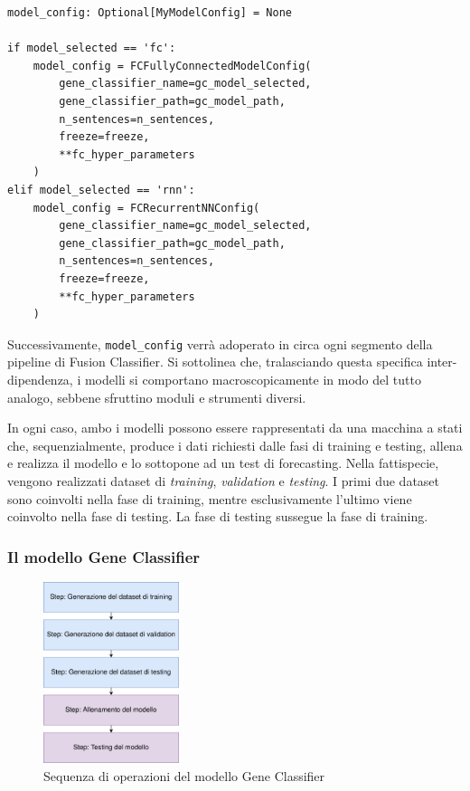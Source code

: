 \begin{code}
\label{code:apx:a:python}
\begin{verbatim}
model_config: Optional[MyModelConfig] = None

if model_selected == 'fc':
    model_config = FCFullyConnectedModelConfig(
        gene_classifier_name=gc_model_selected,
        gene_classifier_path=gc_model_path,
        n_sentences=n_sentences,
        freeze=freeze,
        **fc_hyper_parameters
    )
elif model_selected == 'rnn':
    model_config = FCRecurrentNNConfig(
        gene_classifier_name=gc_model_selected,
        gene_classifier_path=gc_model_path,
        n_sentences=n_sentences,
        freeze=freeze,
        **fc_hyper_parameters
    )
\end{verbatim}
\end{code}

Successivamente, {\small \verb|model_config|} verrà adoperato in circa ogni segmento della pipeline di Fusion Classifier. Si sottolinea che, tralasciando questa specifica inter-dipendenza, i modelli si comportano macroscopicamente in modo del tutto analogo, sebbene sfruttino moduli e strumenti diversi.

In ogni caso, ambo i modelli possono essere rappresentati da una macchina a stati che, sequenzialmente, produce i dati richiesti dalle fasi di training e testing, allena e realizza il modello e lo sottopone ad un test di forecasting. Nella fattispecie, vengono realizzati dataset di {\em training}, {\em validation} e {\em testing}. I primi due dataset sono coinvolti nella fase di training, mentre esclusivamente l'ultimo viene coinvolto nella fase di testing. La fase di testing sussegue la fase di training.

\subsubsection{Il modello Gene Classifier}

\begin{figure}[h]
    \centering
    \includegraphics[width=150px]{figures/ch2/gene_stati.png}
    \caption[Sequenza di operazioni del modello Gene Classifier]{Sequenza di operazioni del modello Gene Classifier}
    \label{fig:cha2:gene_stati}
\end{figure}

